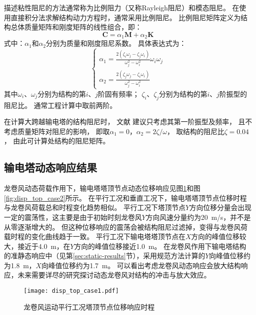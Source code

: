 描述粘性阻尼的方法通常称为比例阻力（又称Rayleigh阻尼）和模态阻尼。
在使用直接积分法求解结构动力方程时，通常采用比例阻尼。
比例阻尼矩阵定义为结构总体质量矩阵和刚度矩阵的线性组合，即：
\begin{equation}
  \bm{C} = \alpha_1 \bm{M} + \alpha_2 \bm{K}
\end{equation}
式中：$\alpha_1$和$\alpha_2$分别为质量和刚度阻尼系数。
具体表达式为：
\begin{equation}
    \begin{cases}
        \alpha_1 = \frac{2\left(\zeta_i\omega_j-\zeta_j \omega_i\right)}{\omega_j^2-\omega_i^2} \omega_i \omega_j \\
        \alpha_2 = \frac{2\left(\zeta_j \omega_j-\zeta_i \omega_i\right)}{\omega_j^2-\omega_i^2} 
    \end{cases}
\end{equation}
其中$\omega_i$、$\omega_j$分别为结构的第$i$、$j$阶固有频率；
$\zeta_i$、$\zeta_j$分别为结构的第$i$、$j$阶振型的阻尼比。
通常工程计算中取前两阶。

在计算大跨越输电塔的结构阻尼时，
文献\cite{wong2009guidelines}\cite{loredo2003influence}\cite{madugula2001dynamic}\cite{ostendorp1997damping}
建议只考虑其第一阶振型及频率，
且不考虑质量矩阵对阻尼的影响，
即取$\alpha_1=0$，$\alpha_2=2\zeta/\omega$，
取结构的阻尼比$\zeta=0.04$\cite{loredo2003influence}，
由此可计算处结构的阻尼矩阵。

\subsection{输电塔动态响应结果}
龙卷风动态荷载作用下，输电塔塔顶节点动态位移响应见图\ref{fig:disp_top_case1}和图\ref{fig:disp_top_case2}所示。
在平行工况和垂直工况下，输电塔塔顶节点位移时程与龙卷风荷载总和时程变化趋势相似。
平行工况下塔顶节点$Y$方向位移分量会出现一定的震荡性，这主要是由于初始时刻龙卷风$Y$方向风速分量约为\SI{20}{m/s}，并不是从零逐渐增大的。
但这种位移响应的震荡会被结构阻尼过滤掉，变得与龙卷风荷载时程的变化曲线趋于一致。
平行工况下输电塔塔顶节点在$X$方向的峰值位移较大，接近于\SI{4.0}{m}，在$Y$方向的峰值位移接近\SI{1.0}{m}。
在龙卷风作用下输电塔结构的准静态响应中（见第\ref{sec:static-results}节），采用规范方法计算的$Y$向峰值位移约为\SI{1.8}{m}，$X$向峰值位移约为\SI{1.7}{m}。
可以看出考虑龙卷风动态响应会放大结构响应，未来需要详尽的研究探讨动态龙卷风对结构的冲击与放大效应。

\begin{figure}[!htpb]
    \centering
    \texttt{[image: disp\_top\_case1.pdf]}
    \caption{龙卷风运动平行工况塔顶节点位移响应时程}
    \label{fig:disp_top_case1}
\end{figure}


